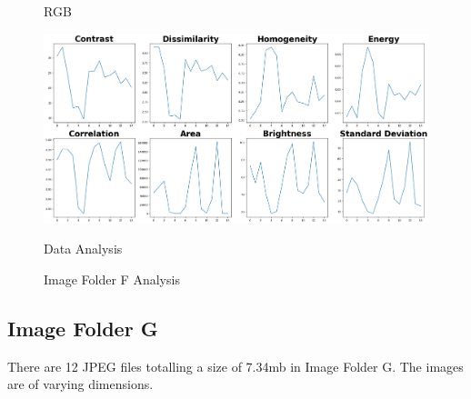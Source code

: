 \begin{figure}[ht]
\begin{minipage}[t]{0.25\textwidth}
        \caption*{RGB}
    \end{minipage}\hfill
    \begin{minipage}[t]{0.50\textwidth}
        \centering
        \includegraphics[width=\textwidth]{Figures/EDA_Charts/8/da.png}
        \caption*{Data Analysis}
    \end{minipage}
    \caption{Image Folder F Analysis}
    \label{fig:Image Folder F Analysis}
\end{figure}

\newpage

\subsection{Image Folder G}

There are 12 JPEG files totalling a size of 7.34mb in Image Folder G. The images are of varying dimensions.

